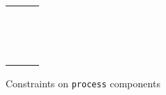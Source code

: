 {\begin{figure}[!h]
{\begin{tabular}{|c|l|l|}
&&\\
&&\\
&&\\
&&\\
&&\\
&&\\
&&\\
&&\\
&&\\
&&\\
&&\\
&&\\
&&\\
&&\\
\hline
\end{tabular}
}
\caption{Constraints on \texttt{process} components}
\label{cons::process}
\end{figure}
}
